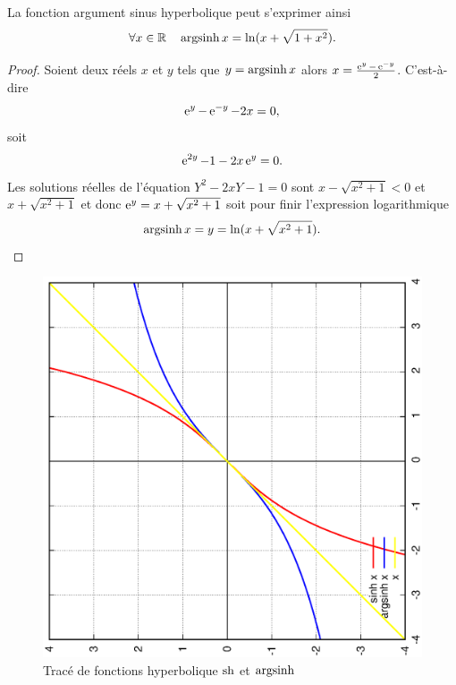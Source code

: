 %
\begin{prop}
La fonction argument sinus hyperbolique peut s'exprimer ainsi
 \begin{equation}
   \forall x \in \mathbb{R} \quad \operatorname{argsinh} x = \ln(x+\sqrt{1+x^2}).
 \end{equation}
\end{prop}
\begin{proof}
  Soient deux réels $x$ et $y$ tels que $y=\operatorname{argsinh} x$ alors $x=\frac{\operatorname{e}^y - \operatorname{e}^{-y}}{2}$. C'est-à-dire
  \begin{equation}
    \operatorname{e}^y - \operatorname{e}^{-y} -2x=0,
  \end{equation}
  soit
  \begin{equation}
    \operatorname{e}^{2y}-1-2x\operatorname{e}^{y}=0.
  \end{equation}
  Les solutions réelles de l'équation $Y^2-2xY-1=0$ sont $x-\sqrt{x^2+1}<0$ et $x+\sqrt{x^2+1}$ et donc $\operatorname{e}^y=x+\sqrt{x^2+1}$ soit pour finir l'expression logarithmique
  \begin{equation}
    \operatorname{argsinh} x = y = \ln(x+\sqrt{x^2+1}).
  \end{equation}
\end{proof}
%
\begin{figure}
  \centering
  \includegraphics[scale=0.4,angle=-90]{argsinh.ps}
  \caption{Tracé de fonctions hyperbolique $\operatorname{sh}$ et $\operatorname{argsinh}$}
  \label{fig:tracesinhargsh}
\end{figure}
%

